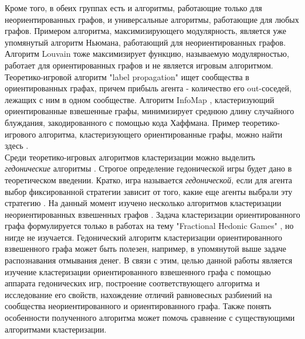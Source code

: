 Кроме того, в обеих группах есть и алгоритмы, работающие только для неориентированных графов, и универсальные алгоритмы, работающие для любых графов. Примером алгоритма, максимизирующего модулярность, является уже упомянутый алгоритм Ньюмана, работающий для неориентированных графов. Алгоритм Louvain тоже максимизирует функцию, называемую модулярностью, работает для ориентированных графов и не является игровым алгоритмом. Теоретико-игровой алгоритм "label propagation" \cite{Raghavan} ищет сообщества в ориентированных графах, причем прибыль агента - количество его out-соседей, лежащих с ним в одном сообществе. Алгоритм InfoMap \cite{infomap}, кластеризующий ориентированные взвешенные графы, минимизирует среднюю длину случайного блуждания, закодированного с помощью кода Хаффмана. Пример теоретико-игрового алгоритма, кластеризующего ориентированные графы, можно найти здесь \cite{Balliu}. \\

Среди теоретико-игровых алгоритмов кластеризации можно выделить \textit{гедонические} алгоритмы \cite{clusteringhg}. Строгое определение гедонической игры будет дано в теоретическом введении. Кратко, игра называется \textit{гедонической}, если для агента выбор фиксированной стратегии зависит от того, какие еще агенты выбрали эту стратегию \cite{framework}. На данный момент изучено несколько алгоритмов кластеризации неориентированных взвешенных графов \cite{clusteringhg}. Задача кластеризации ориентированного графа формулируется только в работах на тему "Fractional Hedonic Games" \cite{fhg2017}, но нигде не изучается. Гедонический алгоритм кластеризации ориентированного взвешенного графа может быть полезен, например, в упомянутой выше задаче распознавания отмывания денег. В связи с этим, целью данной работы является изучение кластеризации ориентированного взвешенного графа с помощью аппарата гедонических игр, построение соответствующего алгоритма и исследование его свойств, нахождение отличий равновесных разбиений на сообщества неориентированного и ориентированного графа. Также понять особенности полученного алгоритма может помочь сравнение с существующими алгоритмами кластеризации.\\
